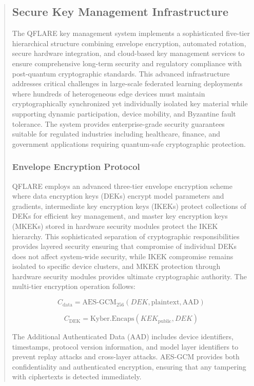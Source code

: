 \documentclass{svproc}
\begin{document}
\begin{abstract}
\subsection{Secure Key Management Infrastructure}

The QFLARE key management system implements a sophisticated five-tier hierarchical structure combining envelope encryption, automated rotation, secure hardware integration, and cloud-based key management services to ensure comprehensive long-term security and regulatory compliance with post-quantum cryptographic standards. This advanced infrastructure addresses critical challenges in large-scale federated learning deployments where hundreds of heterogeneous edge devices must maintain cryptographically synchronized yet individually isolated key material while supporting dynamic participation, device mobility, and Byzantine fault tolerance. The system provides enterprise-grade security guarantees suitable for regulated industries including healthcare, finance, and government applications requiring quantum-safe cryptographic protection.

\subsubsection{Envelope Encryption Protocol}

QFLARE employs an advanced three-tier envelope encryption scheme where data encryption keys (DEKs) encrypt model parameters and gradients, intermediate key encryption keys (IKEKs) protect collections of DEKs for efficient key management, and master key encryption keys (MKEKs) stored in hardware security modules protect the IKEK hierarchy. This sophisticated separation of cryptographic responsibilities provides layered security ensuring that compromise of individual DEKs does not affect system-wide security, while IKEK compromise remains isolated to specific device clusters, and MKEK protection through hardware security modules provides ultimate cryptographic authority. The multi-tier encryption operation follows:

\begin{equation}
C_{\text{data}} = \text{AES-GCM}_{256}(DEK, \text{plaintext}, \text{AAD})
\end{equation}

\begin{equation}
C_{\text{DEK}} = \text{Kyber.Encaps}(KEK_{\text{public}}, DEK)
\end{equation}

The Additional Authenticated Data (AAD) includes device identifiers, timestamps, protocol version information, and model layer identifiers to prevent replay attacks and cross-layer attacks. AES-GCM provides both confidentiality and authenticated encryption, ensuring that any tampering with ciphertexts is detected immediately.


\end{abstract}
\end{document}
